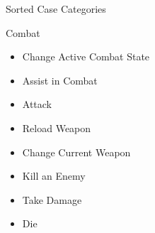 \documentclass[12pt]{article}
\begin{document}
\begin{section}{Sorted Case Categories}
\begin{subsection}{Combat}
\begin{itemize}
\item Change Active Combat State
\item Assist in Combat
\item Attack
\item Reload Weapon
\item Change Current Weapon
\item Kill an Enemy
\item Take Damage
\item Die
\end{itemize}
\end{subsection}
\end{section}
\end{document}
